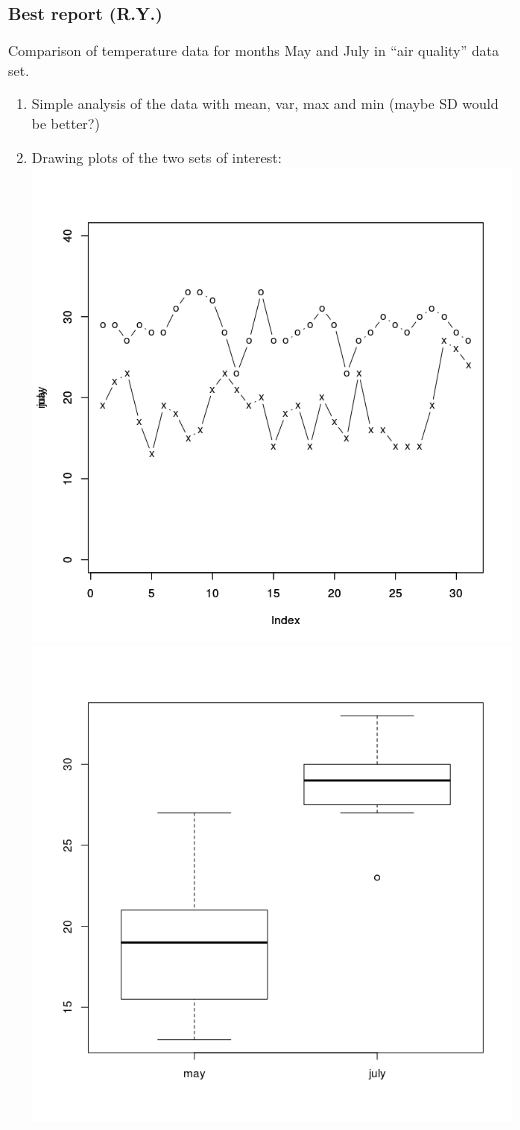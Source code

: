 \documentclass[10pt]{beamer}
\begin{document}
\begin{frame}
  \frametitle{Best report (R.Y.)}
  {\small
  \begin{block}{}
    Comparison of temperature data for months May and July in ``air quality'' data set.
  \end{block}

  \begin{enumerate}
  \item Simple analysis of the data with mean, var, max and min (maybe SD would be better?)
  \item Drawing plots of the two sets of interest:\\
    \includegraphics[height=0.4\textheight]{img/yamamoto1}\hspace{1cm}
    \includegraphics[height=0.4\textheight]{img/yamamoto2}

\end{enumerate}}
\end{frame}
\end{document}
